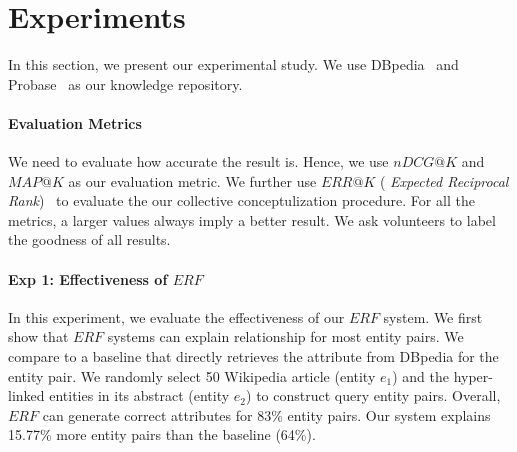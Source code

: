 
\section{Experiments}
\label{sec:exp}

In this section, we present our experimental study.
We use DBpedia~\cite{dbpedia} and Probase~\cite{wu2012probase} as our knowledge repository.
\
\vspace{-4mm}
\paragraph*{Evaluation Metrics}
We need to evaluate how accurate the result is. 
Hence, we use $nDCG@K$ and $MAP@K$ as our evaluation metric.
We further use $ ERR@K$ ( {\it Expected Reciprocal Rank})~\cite{chapelle2009expected} to evaluate the our collective conceptulization procedure.
For all the metrics, a larger values always imply a better result. We ask volunteers to label the goodness of all results.

\vspace{-4mm}
\paragraph*{Exp 1: Effectiveness of $ERF$}
In this experiment, we evaluate the effectiveness of our $ERF$ system.
We first show that $ERF$ systems can explain relationship for most entity pairs.
We compare to a baseline that directly retrieves the attribute from DBpedia for the entity pair.
We randomly select 50 Wikipedia article (entity $e_1$) and the hyper-linked entities in its abstract (entity $e_2$)
to construct query entity pairs.
Overall, $ERF$ can generate correct attributes for 83\% entity pairs.
Our system explains 15.77\% more entity pairs than the baseline (64\%).

